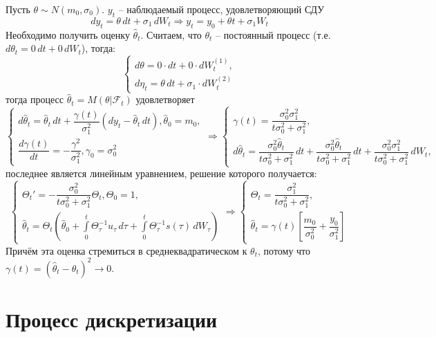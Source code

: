 \begin{ex}
  Пусть $\theta \sim N(m_0, \sigma_0)$. $y_t$ -- наблюдаемый процесс, удовлетворяющий
  СДУ
  \[
    dy_t = \theta \, dt + \sigma_1 \, dW_t \Rightarrow
    y_t = y_0 + \theta t + \sigma_1 W_t
  \]
  Необходимо получить оценку $\hat{\theta}_t$.
  Считаем, что $\theta_t$ -- постоянный процесс (т.е. $d\theta_t = 0 \, dt + 0 \, dW_t$),
  тогда:
  \[
    \begin{cases}
      d\theta = 0 \cdot dt + 0 \cdot dW_t^{(1)}, \\
      d\eta_t = \theta \, dt + \sigma_1 \cdot dW_t^{(2)}
    \end{cases}
  \]
  тогда процесс $\hat{\theta}_t = M(\theta | \mathcal{F}_t)$ удовлетворяет
  \[
    \begin{cases}
      d \hat{\theta}_t = \hat{\theta}_t \, dt + \dfrac{\gamma(t)}{\sigma_1^2} \left( dy_t - \hat{\theta}_t \, dt \right), \hat{\theta}_0 = m_0, \\
      \dfrac{d\gamma(t)}{dt} = - \dfrac{\gamma^2}{\sigma_1^2}, \gamma_0 = \sigma_0^2
    \end{cases}
    \Rightarrow
    \begin{cases}
      \gamma(t) = \dfrac{\sigma_0^2 \sigma_1^2}{t \sigma_0^2 + \sigma_1^2}, \\
      d\hat{\theta}_t = \dfrac{\sigma_0^2 \hat{\theta}_t}{t\sigma_0^2 + \sigma_1^2} \, dt + 
      \dfrac{\sigma_0^2 \hat{\theta}_t}{t\sigma_0^2 + \sigma_1^2} \, dt + \dfrac{\sigma_0^2 \sigma_1^2}{t \sigma_0^2 + \sigma_1^2} \, dW_t,
    \end{cases}
  \]
  последнее является линейным уравнением, решение которого получается:
  \[
    \begin{cases}
      \Theta_t' = - \dfrac{\sigma_0^2}{t\sigma_0^2 + \sigma_1^2} \Theta_t, \Theta_0 = 1, \\
      \hat{\theta}_t = \Theta_t \left( \hat{\theta}_0 + \int\limits_0^t \Theta_\tau^{-1} u_\tau \, d\tau + \int\limits_0^t \Theta_\tau^{-1} s(\tau) \, dW_\tau \right) 
    \end{cases}
    \Rightarrow
    \begin{cases}
      \Theta_t = \dfrac{\sigma_1^2}{t\sigma_0^2 + \sigma_1^2}, \\
      \hat{\theta}_t = \gamma(t) \left[ \dfrac{m_0}{\sigma_0^2} + \dfrac{y_0}{\sigma_1^2} \right] 
    \end{cases}
  \]
  Причём эта оценка стремиться в среднеквадратическом к $\theta_t$, потому что
  $\gamma(t) = \left( \hat{\theta}_t - \theta_t \right)^2 \to 0$.
\end{ex}



\section{Процесс дискретизации}



